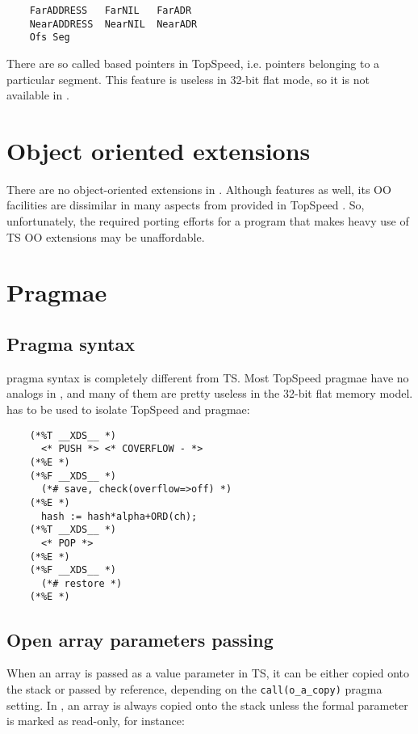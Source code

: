     \verb'    FarADDRESS   FarNIL   FarADR' \\
    \verb'    NearADDRESS  NearNIL  NearADR' \\
    \verb'    Ofs Seg'

    There are so called based pointers in TopSpeed, i.e. pointers belonging to
    a particular segment. This feature is useless in 32-bit flat mode, so
    it is not available in \xds{}.

\section{Object oriented extensions}

    There are no object-oriented extensions in \xds{} \mt{}. Although \xds{}
    features \ot{} as well, its OO facilities are dissimilar in many
    aspects from provided in TopSpeed \mt{}. So, unfortunately,
    the required porting efforts for a program that makes heavy use of
    TS OO extensions may be unaffordable.


\section{Pragmae}

\subsection{Pragma syntax}
\label{tsco:pragmae:syntax}

    \xds{} pragma syntax is completely different from TS. Most TopSpeed 
    pragmae have no analogs in \XDS{}, and many of them are pretty useless
    in the 32-bit flat memory model. 
    has to be used to isolate TopSpeed and \XDS{} pragmae:

\begin{verbatim}
    (*%T __XDS__ *)
      <* PUSH *> <* COVERFLOW - *>
    (*%E *)
    (*%F __XDS__ *)
      (*# save, check(overflow=>off) *)
    (*%E *)
      hash := hash*alpha+ORD(ch);
    (*%T __XDS__ *)
      <* POP *>
    (*%E *)
    (*%F __XDS__ *)
      (*# restore *)
    (*%E *)
\end{verbatim}

\subsection{Open array parameters passing}

    When an array is passed as a value parameter in TS, it can be either copied
    onto the stack or passed by reference, depending on the \verb'call(o_a_copy)'
    pragma setting. In \xds{}, an array is always copied onto the stack unless the
    formal parameter is marked as read-only, for instance:

